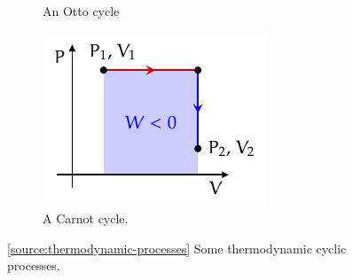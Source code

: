 \documentclass[oneside]{book}
\begin{document}
\begin{itemize}
\begin{figure}[H]
\begin{subfigure}[c]{0.30\textwidth}
            \caption{An Otto cycle}
            \label{fig:otto-cycle-theromdynamics-closed-loop}
        \end{subfigure}%
        \begin{subfigure}[c]{0.30\textwidth}
            \centering
            \includegraphics[page=11]{../images/Thermodynamics/Thermodynamics.pdf}
            \caption{A Carnot cycle.}
            \label{fig:carnot-cycle-theromdynamics-closed-loop}
        \end{subfigure}%
        \caption{\ref{source:thermodynamic-processes} Some thermodynamic cyclic processes.}
        \label{fig:thermodynamic-cyclic-processes}
    \end{figure}
\end{itemize}
\end{document}
